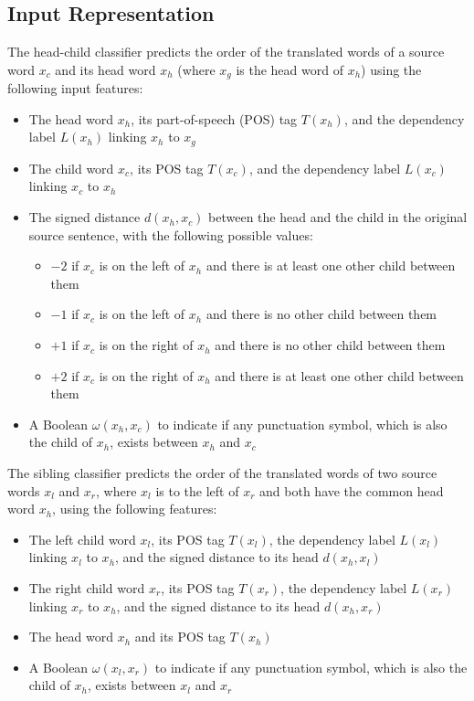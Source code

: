 \documentclass[letterpaper]{article}
\begin{document}
\subsection{Input Representation}
The head-child classifier predicts the order of the translated words of a source word $x_c$ and its head word $x_h$ (where $x_g$ is the head word of $x_h$) using the following input features:
\begin{itemize}
\item The head word $x_h$, its part-of-speech (POS) tag $T(x_h)$, and the dependency label $L(x_h)$ linking $x_h$ to $x_g$
\item The child word $x_c$, its POS tag $T(x_c)$, and the dependency label $L(x_c)$ linking $x_c$ to $x_h$
\item The signed distance $d(x_h,x_c)$ between the head and the child in the original source sentence, with the following possible values:
\begin{itemize}
\item $-2$ if $x_c$ is on the left of $x_h$ and there is at least one other child between them
\item $-1$ if $x_c$ is on the left of $x_h$ and there is no other child between them
\item $+1$ if $x_c$ is on the right of $x_h$ and there is no other child between them
\item $+2$ if $x_c$ is on the right of $x_h$ and there is at least one other child between them
\end{itemize}
\item A Boolean $\omega(x_h,x_c)$ to indicate if any punctuation symbol, which is also the child of $x_h$, exists between $x_h$ and $x_c$
\end{itemize}

The sibling classifier predicts the order of the translated words of two source words $x_l$ and $x_r$, where $x_l$ is to the left of $x_r$ and both have the common head word $x_h$, using the following features:
\begin{itemize}
\item The left child word $x_l$, its POS tag $T(x_l)$, the dependency label $L(x_l)$ linking $x_l$ to $x_h$, and the signed distance to its head $d(x_h,x_l)$
\item The right child word $x_r$, its POS tag $T(x_r)$, the dependency label $L(x_r)$ linking $x_r$ to $x_h$, and the signed distance to its head $d(x_h,x_r)$
\item The head word $x_h$ and its POS tag $T(x_h)$
\item A Boolean $\omega(x_l,x_r)$ to indicate if any punctuation symbol, which is also the child of $x_h$, exists between $x_l$ and $x_r$
\end{itemize}
\end{document}
